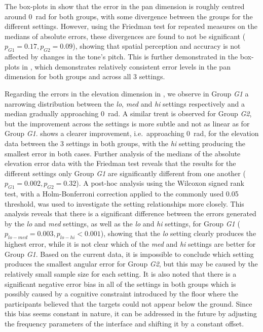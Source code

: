 \documentclass[]{interact}
\begin{document}
The box-plots in  show that the error in the pan dimension is roughly centred around \SI{0}{\radian} for both groups, with some divergence between the groups for the different settings.
However, using the Friedman test for repeated measures on the medians of absolute errors, these divergences are found to not be significant ($p_{G1} = 0.17, p_{G2} = 0.09$), showing that spatial perception and accuracy is not affected by changes in the tone's pitch.
This is further demonstrated in the box-plots in , which demonstrates relatively consistent error levels in the pan dimension for both groups and across all 3 settings. 

Regarding the errors in the elevation dimension in , we observe in Group \textit{G1} a narrowing distribution between the \textit{lo}, \textit{med} and \textit{hi} settings respectively and a median gradually approaching \SI{0}{\radian}.
A similar trent is observed for Group \textit{G2}, but the improvement across the settings is more subtle and not as linear as for Group \textit{G1}.
 shows a clearer improvement, i.e.\ approaching \SI{0}{\radian}, for the elevation data between the 3 settings in both groups, with the \textit{hi} setting producing the smallest error in both cases.
Further analysis of the medians of the absolute elevation error data with the Friedman test reveals that the results for the different settings only Group \textit{G1} are significantly different from one another ($p_{G1} = 0.002, p_{G2} = 0.32$).
A post-hoc analysis using the Wilcoxon signed rank test, with a Holm-Bonferroni correction applied to the commonly used 0.05 threshold, was used to investigate the setting relationships more closely. 
This analysis reveals that there is a significant difference between the errors generated by the \textit{lo} and \textit{med} settings, as well as the \textit{lo} and \textit{hi} settings, for Group \textit{G1} ($p_{lo-med} = 0.003, p_{lo-hi} < 0.001$), showing that the \textit{lo} setting clearly produces the highest error, while it is not clear which of the \textit{med} and \textit{hi} settings are better for Group \textit{G1}. 
Based on the current data, it is impossible to conclude which setting produces the smallest angular error for Group \textit{G2}, but this may be caused by the relatively small sample size for each setting. 
It is also noted that there is a significant negative error bias in all of the settings in both groups which is possibly caused by a cognitive constraint introduced by the floor where the participants believed that the targets could not appear below the ground.
Since this bias seems constant in nature, it can be addressed in the future by adjusting the frequency parameters of the interface and shifting it by a constant offset. 
\end{document}
